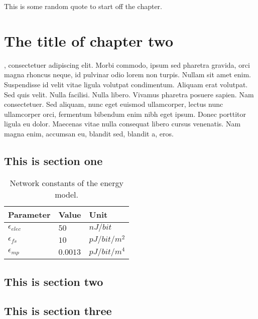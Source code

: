 \begin{savequote}[75mm] 
This is some random quote to start off the chapter.
\end{savequote}

\chapter{The title of chapter two}

, consectetuer adipiscing elit. Morbi commodo, ipsum sed pharetra gravida, orci magna rhoncus neque, id pulvinar odio lorem non turpis. Nullam sit amet enim. Suspendisse id velit vitae ligula volutpat condimentum. Aliquam erat volutpat. Sed quis velit. Nulla facilisi. Nulla libero. Vivamus pharetra posuere sapien. Nam consectetuer. Sed aliquam, nunc eget euismod ullamcorper, lectus nunc ullamcorper orci, fermentum bibendum enim nibh eget ipsum. Donec porttitor ligula eu dolor. Maecenas vitae nulla consequat libero cursus venenatis. Nam magna enim, accumsan eu, blandit sed, blandit a, eros.

\section{This is section one}
\blindtext

\blinditemize

\begin{table}[tb]
  \centering
  \caption{Network constants of the energy model.}
  \label{tab:network_constants}
  \small
  \begin{tabular}{lll}
    \toprule
    Parameter & Value & Unit \\
    \midrule
    $\epsilon_{elec}$ & $50$ &  $nJ/bit$ \\
    $\epsilon_{fs}$ & $10$ & $pJ/bit/m^2$ \\
    $\epsilon_{mp}$ & $0.0013$ & $pJ/bit/m^4$ \\
    \bottomrule
  \end{tabular}
\end{table} 


\blindmathpaper

\blindtext@formula 

\section{This is section two}
\blindtext
\blindmathpaper

\section{This is section three}
\blindtext
\blindmathpaper